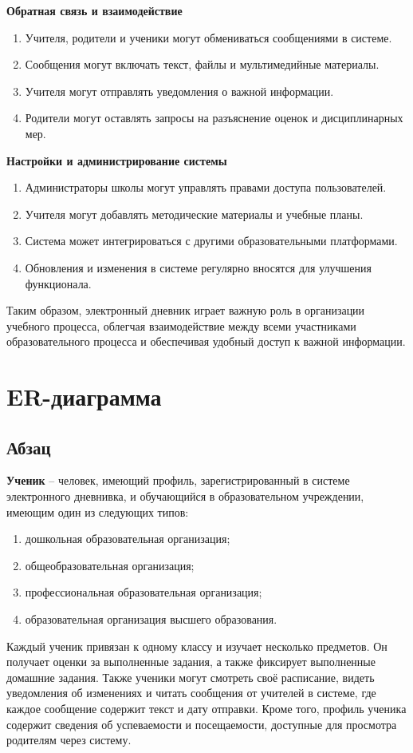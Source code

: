 \documentclass[a4paper, final]{article}
\begin{document}
\noindent \textbf{Обратная связь и взаимодействие}
\begin{enumerate}
  \item Учителя, родители и ученики могут обмениваться сообщениями в системе.
  \item Сообщения могут включать текст, файлы и мультимедийные материалы.
  \item Учителя могут отправлять уведомления о важной информации.
  \item Родители могут оставлять запросы на разъяснение оценок и дисциплинарных мер.
\end{enumerate}


\noindent \textbf{Настройки и администрирование системы}
\begin{enumerate}
  \item Администраторы школы могут управлять правами доступа пользователей.
  \item Учителя могут добавлять методические материалы и учебные планы.
  \item Система может интегрироваться с другими образовательными платформами.
  \item Обновления и изменения в системе регулярно вносятся для улучшения функционала.
\end{enumerate}
  
Таким образом, электронный дневник играет важную роль в организации учебного процесса, облегчая взаимодействие между всеми участниками образовательного процесса и обеспечивая удобный доступ к важной информации.

\newpage
\section{ER-диаграмма}
\subsection{Абзац}
\textbf{Ученик} -- человек, имеющий профиль, зарегистрированный в системе электронного дневнивка, и обучающийся в образовательном учреждении, имеющим один из следующих типов:
\begin{enumerate}
  \item дошкольная образовательная организация;
  \item общеобразовательная организация;
  \item профессиональная образовательная организация;
  \item образовательная организация высшего образования.
\end{enumerate}
Каждый ученик привязан к одному классу и изучает несколько предметов. Он получает оценки за выполненные задания, а также фиксирует выполненные домашние задания. Также ученики могут смотреть своё расписание, видеть уведомления об изменениях и читать сообщения от учителей в системе, где каждое сообщение содержит текст и дату отправки. Кроме того, профиль ученика содержит сведения об успеваемости и посещаемости, доступные для просмотра родителям через систему.
\end{document}
